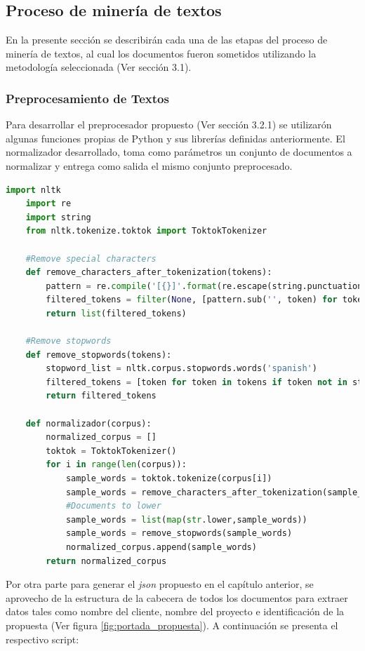 \subsection{Proceso de minería de textos}
    En la presente sección se describirán cada una de las etapas del proceso de minería de textos, al cual los documentos fueron sometidos utilizando la metodología seleccionada (Ver sección 3.1).

\subsubsection{Preprocesamiento de Textos}
    Para desarrollar el preprocesador propuesto (Ver sección 3.2.1) se utilizarón algunas funciones propias de Python y sus librerías definidas anteriormente. El normalizador desarrollado, toma como parámetros un conjunto de documentos a normalizar y entrega como salida el mismo conjunto preprocesado.  

    \begin{lstlisting}[language=Python]
    import nltk
    import re
    import string
    from nltk.tokenize.toktok import ToktokTokenizer
    
    #Remove special characters
    def remove_characters_after_tokenization(tokens):
        pattern = re.compile('[{}]'.format(re.escape(string.punctuation)))
        filtered_tokens = filter(None, [pattern.sub('', token) for token in tokens])
        return list(filtered_tokens)
    
    #Remove stopwords
    def remove_stopwords(tokens):
        stopword_list = nltk.corpus.stopwords.words('spanish')
        filtered_tokens = [token for token in tokens if token not in stopword_list]
        return filtered_tokens
    
    def normalizador(corpus):
        normalized_corpus = []
        toktok = ToktokTokenizer()
        for i in range(len(corpus)):
            sample_words = toktok.tokenize(corpus[i])
            sample_words = remove_characters_after_tokenization(sample_words)
            #Documents to lower
            sample_words = list(map(str.lower,sample_words))
            sample_words = remove_stopwords(sample_words)
            normalized_corpus.append(sample_words)
        return normalized_corpus
    \end{lstlisting}
    
    Por otra parte para generar el \textit{json} propuesto en el capítulo anterior, se aprovecho de la estructura de la cabecera de todos los documentos para extraer datos tales como nombre del cliente, nombre del proyecto e identificación de la propuesta (Ver figura \ref{fig:portada_propuesta}). A continuación se presenta el respectivo script:
    
